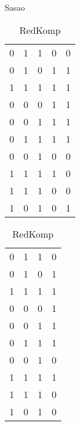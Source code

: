 \begin{table}[H]
\begin{subtable}{.64\linewidth}
\end{subtable}
\begin{subtable}{.12\linewidth}
\caption{Sasao}
\label{sasao-b}
\begin{tabular}{|r@{}c@{}c@{}c@{}l|}
\hline
0 & 1 & 1 & 0 & 0 \\
0 & 1 & 0 & 1 & 1 \\
1 & 1 & 1 & 1 & 1 \\
0 & 0 & 0 & 1 & 1 \\
0 & 0 & 1 & 1 & 1 \\
0 & 1 & 1 & 1 & 1 \\
0 & 0 & 1 & 0 & 0 \\
1 & 1 & 1 & 1 & 0 \\
1 & 1 & 1 & 0 & 0 \\
1 & 0 & 1 & 0 & 1 \\
\hline
\end{tabular}
\end{subtable}
\begin{subtable}{.16\linewidth}
\caption{RedKomp}
\label{sasao-c}
\begin{tabular}{|r@{}c@{}c@{}l|}
\hline
0 & 1 & 1 & 0 \\
0 & 1 & 0 & 1 \\
1 & 1 & 1 & 1 \\
0 & 0 & 0 & 1 \\
0 & 0 & 1 & 1 \\
0 & 1 & 1 & 1 \\
0 & 0 & 1 & 0 \\
1 & 1 & 1 & 1 \\
1 & 1 & 1 & 0 \\
1 & 0 & 1 & 0 \\
\hline
\end{tabular}
\end{subtable}
\end{table}
